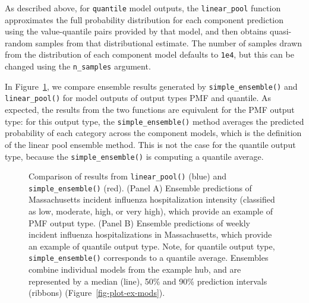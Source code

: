 \documentclass[
]{article}
\begin{document}
As described above, for \texttt{quantile} model outputs, the
\texttt{linear\_pool} function approximates the full probability
distribution for each component prediction using the value-quantile
pairs provided by that model, and then obtains quasi-random samples from
that distributional estimate. The number of samples drawn from the
distribution of each component model defaults to \texttt{1e4}, but this
can be changed using the \texttt{n\_samples} argument.

In Figure~\ref{fig-plot-ex-quantile-and-linear-pool}, we compare
ensemble results generated by \texttt{simple\_ensemble()} and
\texttt{linear\_pool()} for model outputs of output types PMF and
quantile. As expected, the results from the two functions are equivalent
for the PMF output type: for this output type, the
\texttt{simple\_ensemble()} method averages the predicted probability of
each category across the component models, which is the definition of
the linear pool ensemble method. This is not the case for the quantile
output type, because the \texttt{simple\_ensemble()} is computing a
quantile average.

\begin{figure}


\caption{\label{fig-plot-ex-quantile-and-linear-pool}Comparison of
results from \texttt{linear\_pool()} (blue) and
\texttt{simple\_ensemble()} (red). (Panel A) Ensemble predictions of
Massachusetts incident influenza hospitalization intensity (classified
as low, moderate, high, or very high), which provide an example of PMF
output type. (Panel B) Ensemble predictions of weekly incident influenza
hospitalizations in Massachusetts, which provide an example of quantile
output type. Note, for quantile output type, \texttt{simple\_ensemble()}
corresponds to a quantile average. Ensembles combine individual models
from the example hub, and are represented by a median (line), 50\% and
90\% prediction intervals (ribbons) (Figure~\ref{fig-plot-ex-mods}).}

\end{figure}%
\end{document}
